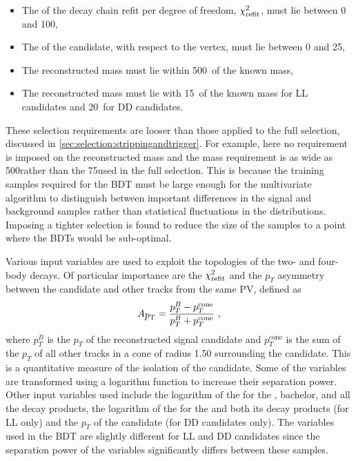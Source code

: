 \begin{itemize}
\item The \chisq of the decay chain refit per degree of freedom, $\chi^2_\text{refit}$, must lie between 0 and 100,
\item The \chisqip of the \Bm candidate, with respect to the \Bm vertex, must lie between 0 and 25,
\item The reconstructed \Kstarm mass must lie within 500~\mevcc of the known \Kstarm mass,
\item The reconstructed \KS mass must lie with 15~\mevcc of the known \KS mass for LL candidates and 20~\mevcc for DD candidates.
\end{itemize}
These selection requirements are looser than those applied to the full selection, discussed in \sect\ref{sec:selection:strippingandtrigger}. For example, here no requirement is imposed on the reconstructed \Dz mass and the \Kstarm mass requirement is as wide as 500\mevcc rather than the 75\mevcc used in the full selection. This is because the training samples required for the BDT must be large enough for the multivariate algorithm to distinguish between important differences in the signal and background samples rather than statistical fluctuations in the distributions. Imposing a tighter selection is found to reduce the size of the samples to a point where the BDTs would be sub-optimal.

Various input variables are used to exploit the topologies of the two- and four-body decays. Of particular importance are the $\chi^2_\text{refit}$ and the $p_T$ asymmetry between the \Bm candidate and other tracks from the same PV, defined as
\begin{equation}
A_{\mbox{$p_{\mathrm{ T}}$}} = \frac{p_T^B - p_T^{\text{cone}}}{p_T^B + p_T^{\text{cone}}} \text{ ,}
\label{ptasy}
\end{equation}
where $p_T^B$ is the $p_T$ of the reconstructed \Bm signal candidate and $p_T^{\text{cone}}$ is the sum of the $p_T$ of all other tracks in a cone of radius 1.50 surrounding the \Bm candidate. This is a quantitative measure of the isolation of the \Bm candidate. Some of the variables are transformed using a logarithm function to increase their separation power. Other input variables used include the logarithm of the \chisqip for the \Bm, bachelor, \Dz and all the \Dz decay products, the logarithm of the \chisqip for the \KS and both its decay products (for LL only) and the $p_T$ of the \KS candidate (for DD candidates only). The variables used in the BDT are slightly different for LL and DD candidates since the separation power of the \KS variables significantly differs between these samples. 

